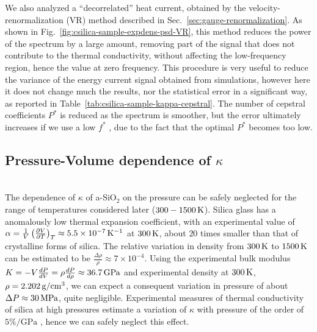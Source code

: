 We also analyzed a ``decorrelated'' heat current, obtained by the velocity-renormalization (VR) method described in Sec.~\ref{sec:gauge-renormalization}. As shown in Fig.~\ref{fig:csilica-sample-expdens-psd-VR}, this method reduces the power of the spectrum by a large amount, removing part of the signal that does not contribute to the thermal conductivity, without affecting the low-frequency region, hence the value at zero frequency. 
This procedure is very useful to reduce the variance of the energy current signal obtained from \abinitio simulations, however here it does not change much the results, nor the statistical error in a significant way, as reported in Table~\ref{tab:csilica-sample-kappa-cepstral}. 
The number of cepstral coefficients $P^*$ is reduced as the spectrum is smoother, but the error ultimately increases if we use a low $f^*$ , due to the fact that the optimal $P^*$ becomes too low. 



\subsection{Pressure-Volume dependence of \texorpdfstring{$\kappa$}{thermal conductivity}}
\\
The dependence of $\kappa$ of a-SiO$_2$ on the pressure can be safely neglected for the range of temperatures considered later ($300-1500\,\mathrm{K}$). 
Silica glass has a anomalously low thermal expansion coefficient, with an experimental value of $\alpha = \frac{1}{V}\left(\frac{\partial V}{\partial T}\right)_T \approx 5.5\times 10^{-7} \,\mathrm{K^{-1}}$ at $300\,\mathrm{K}$, about $20$ times smaller than that of crystalline forms of silica. 
The relative variation in density from $300\,\mathrm{K}$ to $1500\,\mathrm{K}$ can be estimated to be $\frac{\Delta\rho}{\rho} \approx 7\times 10^{-4}$.
Using the experimental bulk modulus $K=-V\frac{dP}{dV}=\rho\frac{dP}{d\rho}\approx 36.7\,\mathrm{GPa}$ and experimental density at $300\,\mathrm{K}$, $\rho=2.202\,\mathrm{g/cm^3}$, we can expect a consequent variation in pressure of about $\Delta P \approx 30\,\mathrm{MPa}$, quite negligible. 
Experimental measures of thermal conductivity of silica at high pressures estimate a variation of $\kappa$ with pressure of the order of $5\%/\mathrm{GPa}$ \cite{Andersson1992}, hence we can safely neglect this effect. 

